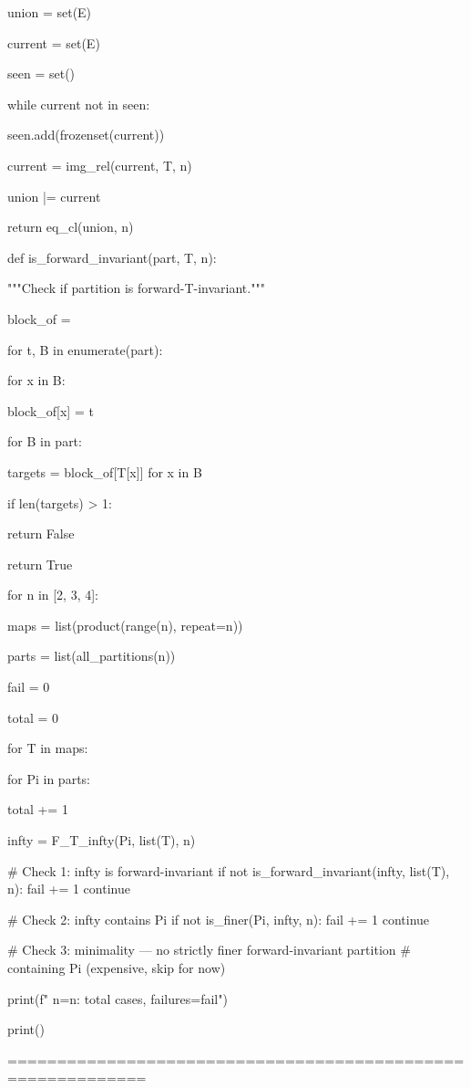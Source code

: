 union = set(E)

current = set(E)

seen = set()

while current not in seen:

seen.add(frozenset(current))

current = img_rel(current, T, n)

union |= current

return eq_cl(union, n)


def is_forward_invariant(part, T, n):

"""Check if partition is forward-T-invariant."""

block_of = {}

for t, B in enumerate(part):

for x in B:

block_of[x] = t

for B in part:

targets = {block_of[T[x]] for x in B}

if len(targets) > 1:

return False

return True


for n in [2, 3, 4]:

maps = list(product(range(n), repeat=n))

parts = list(all_partitions(n))

fail = 0

total = 0

for T in maps:

for Pi in parts:

total += 1

infty = F_T_infty(Pi, list(T), n)


        # Check 1: infty is forward-invariant  
        if not is_forward_invariant(infty, list(T), n):  
            fail += 1  
            continue  
          
        # Check 2: infty contains Pi  
        if not is_finer(Pi, infty, n):  
            fail += 1  
            continue  
          
        # Check 3: minimality — no strictly finer forward-invariant partition  
        # containing Pi (expensive, skip for now)  
  
print(f"  n={n}: {total} cases, failures={fail}")  



print()


============================================================



